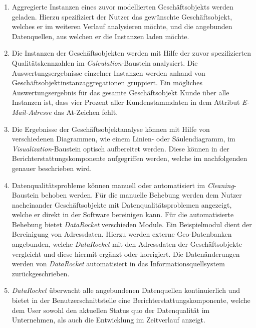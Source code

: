 \documentclass[
  language=german, %
  type=bachelor,%
  ngerman
]{isthesis}
\begin{document}
\begin{content}
\begin{enumerate}
		\item Aggregierte Instanzen eines zuvor modellierten Geschäftsobjekts
		werden geladen. Hierzu spezifiziert der Nutzer das gewünschte
		Geschäftsobjekt, welches er im weiteren Verlauf analysieren möchte, und die
		angebunden Datenquellen, aus welchen er die Instanzen laden möchte.

		\item Die Instanzen der Geschäftsobjekten werden mit Hilfe der zuvor
		spezifizierten Qualitätskennzahlen im \textit{Calculation}-Baustein
		analysiert. Die Auswertungsergebnisse einzelner Instanzen werden anhand von
		Geschäftsobjektinstanzaggregationen gruppiert. Ein mögliches
		Auswertungsergebnis für das gesamte Geschäftsobjekt Kunde über alle
		Instanzen ist, dass vier Prozent aller Kundenstammdaten in dem Attribut
		\textit{E-Mail-Adresse} das At-Zeichen fehlt.

    \item Die Ergebnisse der Geschäftsobjektanalyse können mit Hilfe von
      verschiedenen Diagrammen, wie \zB{} einem Linien- oder Säulendiagramm, im
      \textit{Visualization}-Baustein optisch aufbereitet werden. Diese können
      in der Berichterstattungskomponente aufgegriffen werden, welche im
      nachfolgenden genauer beschrieben wird.

    \item Datenqualitätsprobleme können manuell oder automatisiert im
      \textit{Cleaning}-Baustein behoben werden. Für die manuelle Behebung
      werden dem Nutzer nacheinander Geschäftsobjekte mit
      Datenqualitätsproblemen angezeigt, welche er direkt in der Software
      bereinigen kann. Für die automatisierte Behebung bietet
      \textit{DataRocket} verschieden Module. Ein Beispiel\-modul dient der
      Bereinigung von Adressdaten. Hierzu werden externe
      Geo-Datenbanken  angebunden, welche
      \textit{DataRocket} mit den Adressdaten der Geschäftsobjekte vergleicht
			und diese hiermit \ggf{} ergänzt oder korrigiert. Die Datenänderungen
			werden von \textit{DataRocket} automatisiert in das
			Informationsquellsystem zurückgeschrieben.

    \item \textit{DataRocket} überwacht alle angebundenen Datenquellen
      kontinuierlich und bietet in der Benutzerschnittstelle eine
      Berichterstattungskomponente, welche dem User sowohl den aktuellen Status
      quo der Datenqualität im Unternehmen, als auch die Entwicklung im
      Zeitverlauf anzeigt.
	\end{enumerate}


\end{content}
\end{document}
